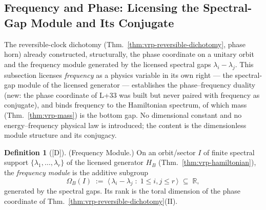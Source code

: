 \documentclass[12pt,oneside]{amsbook}
\theoremstyle{plain}
\theoremstyle{definition}
\newtheorem{definition}[theorem]{Definition}
\theoremstyle{remark}
\newcommand{\status}[1]{\textup{[#1]}}
\begin{document}
\subsection{Frequency and Phase: Licensing the Spectral-Gap Module
and Its Conjugate}
\label{sec:vrp-frequency}

The reversible-clock dichotomy (Thm.~\ref{thm:vrp-reversible-dichotomy},
phase horn) already constructed, structurally, the phase coordinate on
a unitary orbit and the frequency module generated by the licensed
spectral gaps $\lambda_i - \lambda_j$.  This subsection licenses
\emph{frequency} as a physics variable in its own right --- the
spectral-gap module of the licensed generator --- establishes the
phase--frequency duality (new: the phase coordinate of L+33 was built
but never paired with frequency as conjugate), and binds frequency to
the Hamiltonian spectrum, of which mass (Thm.~\ref{thm:vrp-mass}) is the
bottom gap.  No dimensional constant and no energy--frequency physical
law is introduced; the content is the dimensionless module structure
and its conjugacy.

\begin{definition}[\status{D}]\label{def:vrp-frequency-module}
\textup{(Frequency Module.)}
On an orbit/sector $I$ of finite spectral support
$\{\lambda_1,\dots,\lambda_r\}$ of the licensed generator $H_B$
(Thm.~\ref{thm:vrp-hamiltonian}), the \emph{frequency module} is the
additive subgroup
\[
  \Omega_B(I) \;:=\; \bigl\langle\, \lambda_i - \lambda_j \;:\;
  1 \le i,j \le r \,\bigr\rangle \;\subseteq\; \mathbb{R},
\]
generated by the spectral gaps.  Its rank is the toral dimension of the
phase coordinate of Thm.~\ref{thm:vrp-reversible-dichotomy}(II).
\end{definition}
\end{document}
